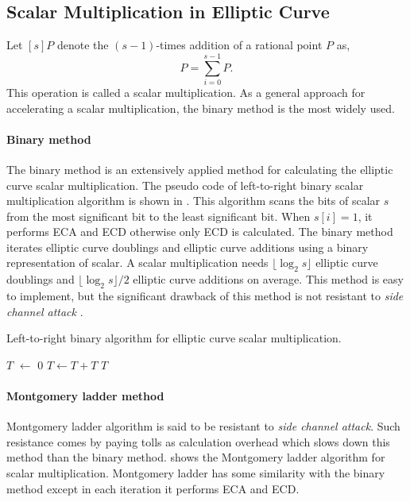 \subsection{Scalar Multiplication in Elliptic Curve}
\label{sec:chap:fund:scm}
Let $[s]P$ denote the $(s-1)$-times addition of a rational point $P$ as, 
\begin{equation}
[s]P = \sum_{i = 0}^{s-1}{P}.
\end{equation}
This operation is called a scalar multiplication.
As a general approach for accelerating a scalar multiplication, the binary method is the most widely used.

\paragraph{Binary method}
\label{sec:chap:fund:binscm}
The binary method is an extensively applied method for calculating the elliptic curve scalar multiplication. 
The pseudo code of left-to-right binary scalar multiplication algorithm is shown in . 
This algorithm scans the bits of scalar $s$ from the most significant bit to the least significant bit. When $s[i] = 1$, it  performs ECA and ECD otherwise only ECD is calculated. 
The binary method iterates elliptic curve doublings and elliptic curve additions using a binary representation of scalar.
A scalar multiplication needs $\lfloor \log_2 s\rfloor$ elliptic curve doublings and $\lfloor \log_2 s\rfloor/2$ elliptic curve additions on average.
This method is easy to implement, but the significant drawback of this method is not resistant to \textit{side channel attack} \cite{C:Kocher96}.  

\begin{algorithm}[ht]
	\caption{Left-to-right binary algorithm for elliptic curve scalar multiplication.}
	\label{alg:binary_scm_chap_fundamental}
	\DontPrintSemicolon
	$T$ $ \leftarrow$ $0$ \;
	 {
		$T \leftarrow T  + T$\;
		 }
	 $T$\;
\end{algorithm}

\paragraph{Montgomery ladder method}
\label{sec:chap:fund:montscm}
Montgomery ladder algorithm is said to be resistant to \textit{side channel attack}. Such resistance comes by paying tolls as calculation overhead which slows down this method than the binary method.   shows the Montgomery ladder algorithm for scalar multiplication. Montgomery ladder has some similarity with the binary method except in each iteration it performs ECA and ECD. 

